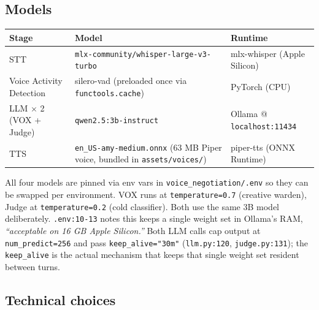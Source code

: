 \documentclass[11pt,a4paper]{article}
\begin{document}
\subsection{Models}
\begin{table}[H]
\centering
\small
\renewcommand{\arraystretch}{1.25}
\begin{tabularx}{\linewidth}{l X X}
\toprule
\textbf{Stage} & \textbf{Model} & \textbf{Runtime} \\
\midrule
STT & \texttt{mlx-community/whisper-large-v3-turbo} & mlx-whisper (Apple Silicon) \\
Voice Activity Detection & silero-vad (preloaded once via \texttt{functools.cache}) & PyTorch (CPU) \\
LLM $\times$ 2 (VOX + Judge) & \texttt{qwen2.5:3b-instruct} & Ollama @ \texttt{localhost:11434} \\
TTS & \texttt{en\_US-amy-medium.onnx} (63 MB Piper voice, bundled in \texttt{assets/voices/}) & piper-tts (ONNX Runtime) \\
\bottomrule
\end{tabularx}
\end{table}

\noindent All four models are pinned via env vars in
\texttt{voice\_negotiation/.env} so they can be swapped per environment. VOX
runs at \texttt{temperature=0.7} (creative warden), Judge at
\texttt{temperature=0.2} (cold classifier). Both use the same 3B model
deliberately. \texttt{.env:10-13} notes this keeps a single weight set in
Ollama's RAM, \emph{``acceptable on 16 GB Apple Silicon.''} Both LLM calls cap
output at \texttt{num\_predict=256} and pass \texttt{keep\_alive="30m"}
(\texttt{llm.py:120}, \texttt{judge.py:131}); the \texttt{keep\_alive} is the
actual mechanism that keeps that single weight set resident between turns.

\subsection{Technical choices}
\end{document}
